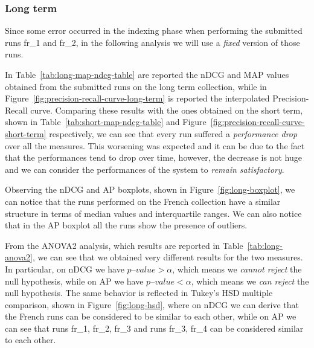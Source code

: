 \clearpage

\subsubsection{Long term}
\label{subsubsec:long-res}

Since some error occurred in the indexing phase when performing the submitted runs fr\_1 and fr\_2, in the following analysis we will use a \emph{fixed} version of those runs.

In Table~\ref{tab:long-map-ndcg-table} are reported the \ac{nDCG} and \ac{MAP} values obtained from the submitted runs on the long term collection, while in Figure~\ref{fig:precision-recall-curve-long-term} is reported the interpolated Precision-Recall curve. Comparing these results with the ones obtained on the short term, shown in Table~\ref{tab:short-map-ndcg-table} and Figure~\ref{fig:precision-recall-curve-short-term} respectively, we can see that every run suffered a \emph{performance drop} over all the measures. This worsening was expected and it can be due to the fact that the performances tend to drop over time, however, the decrease is not huge and we can consider the performances of the system to \emph{remain satisfactory}.

Observing the \ac{nDCG} and \ac{AP} boxplots, shown in Figure~\ref{fig:long-boxplot}, we can notice that the runs performed on the French collection have a similar structure in terms of median values and interquartile ranges. We can also notice that in the \ac{AP} boxplot all the runs show the presence of outliers. 

From the ANOVA2 analysis, which results are reported in Table~\ref{tab:long-anova2}, we can see that we obtained very different results for the two measures. In particular, on \ac{nDCG} we have $p\textrm{--}value>\alpha$, which means we \emph{cannot reject} the null hypothesis, while on \ac{AP} we have $p\textrm{--}value<\alpha$, which means we \emph{can reject} the null hypothesis. The same behavior is reflected in Tukey's \ac{HSD} multiple comparison, shown in Figure~\ref{fig:long-hsd}, where on \ac{nDCG} we can derive that the French runs can be considered to be similar to each other, while on \ac{AP}  we can see that runs fr\_1, fr\_2, fr\_3 and runs fr\_3, fr\_4 can be considered similar to each other.

